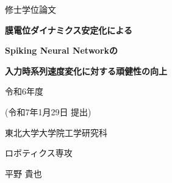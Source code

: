 \begin{titlepage}
    \begin{center}
        {\fontsize{24pt}{24pt}\selectfont  修士学位論文}
        \vspace{3cm}
  
        {\fontsize{20pt}{20pt}\selectfont \textbf{膜電位ダイナミクス安定化による}}
        \vspace{0.5cm}

        {\fontsize{20pt}{20pt}\selectfont \textbf{Spiking Neural Networkの}}
        \vspace{0.5cm}

        {\fontsize{20pt}{20pt}\selectfont \textbf{入力時系列速度変化に対する頑健性の向上}}
        \vspace{7cm}

        {\fontsize{18pt}{18pt}\selectfont 令和6年度} 
        \vspace{0.5cm}

        {\fontsize{18pt}{18pt}\selectfont (令和7年1月29日 提出)} 
        \vspace{3cm}

        {\fontsize{18pt}{18pt}\selectfont 東北大学大学院工学研究科}
        \vspace{0.5cm}

        {\fontsize{18pt}{18pt}\selectfont ロボティクス専攻}
        \vspace{1.0cm}

        {\fontsize{18pt}{18pt}\selectfont 平野 貴也}
    \end{center}
  \end{titlepage}
\cleardoublepage